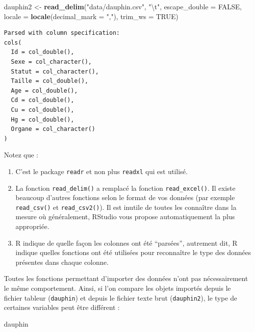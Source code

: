 \documentclass[
  a4paper,
]{article}
\newenvironment{Shaded}{\begin{snugshade}}{\end{snugshade}}
\newcommand{\CharTok}[1]{\textcolor[rgb]{0.57,0.30,0.62}{#1}}
\newcommand{\DataTypeTok}[1]{\textcolor[rgb]{0.00,0.34,0.68}{#1}}
\newcommand{\KeywordTok}[1]{\textcolor[rgb]{0.12,0.11,0.11}{\textbf{#1}}}
\newcommand{\NormalTok}[1]{\textcolor[rgb]{0.12,0.11,0.11}{#1}}
\newcommand{\OtherTok}[1]{\textcolor[rgb]{0.00,0.43,0.16}{#1}}
\newcommand{\StringTok}[1]{\textcolor[rgb]{0.75,0.01,0.01}{#1}}
\providecommand{\tightlist}{%
  \setlength{\itemsep}{0pt}\setlength{\parskip}{0pt}}
\begin{document}
\begin{Shaded}
\begin{Highlighting}[]
\NormalTok{dauphin2 <-}\StringTok{ }\KeywordTok{read_delim}\NormalTok{(}\StringTok{"data/dauphin.csv"}\NormalTok{, }\StringTok{"}\CharTok{\textbackslash{}t}\StringTok{"}\NormalTok{, }\DataTypeTok{escape_double =} \OtherTok{FALSE}\NormalTok{, }
    \DataTypeTok{locale =} \KeywordTok{locale}\NormalTok{(}\DataTypeTok{decimal_mark =} \StringTok{","}\NormalTok{), }\DataTypeTok{trim_ws =} \OtherTok{TRUE}\NormalTok{)}
\end{Highlighting}
\end{Shaded}

\begin{verbatim}
Parsed with column specification:
cols(
  Id = col_double(),
  Sexe = col_character(),
  Statut = col_character(),
  Taille = col_double(),
  Age = col_double(),
  Cd = col_double(),
  Cu = col_double(),
  Hg = col_double(),
  Organe = col_character()
)
\end{verbatim}

Notez que :

\begin{enumerate}
\def\labelenumi{\arabic{enumi}.}
\tightlist
\item
  C'est le package \texttt{readr} et non plus \texttt{readxl} qui est utilisé.
\item
  La fonction \texttt{read\_delim()} a remplacé la fonction \texttt{read\_excel()}. Il existe beaucoup d'autres fonctions selon le format de vos données (par exemple \texttt{read\_csv()} et \texttt{read\_csv2()}). Il est inutile de toutes les connaître dans la mesure où généralement, RStudio vous propose automatiquement la plus appropriée.
\item
  R indique de quelle façon les colonnes ont été ``parsées'', autrement dit, R indique quelles fonctions ont été utilisées pour reconnaître le type des données présentes dans chaque colonne.
\end{enumerate}

Toutes les fonctions permettant d'importer des données n'ont pas nécessairement le même comportement. Ainsi, si l'on compare les objets importés depuis le fichier tableur (\texttt{dauphin}) et depuis le fichier texte brut (\texttt{dauphin2}), le type de certaines variables peut être différent :

\begin{Shaded}
\begin{Highlighting}[]
\NormalTok{dauphin}
\end{Highlighting}
\end{Shaded}
\end{document}
